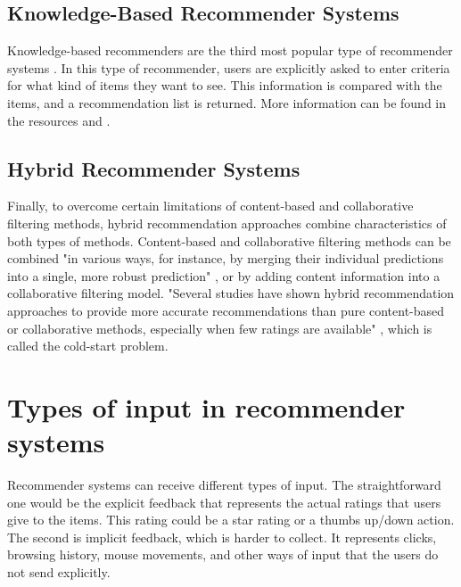 
\subsection{Knowledge-Based Recommender Systems}\label{chapter:knowledge_based}

Knowledge-based recommenders are the third most popular type of recommender systems \cite{burke2000knowledge}. In this type of recommender, users are explicitly asked to enter criteria for what kind of items they want to see. This information is compared with the items, and a recommendation list is returned. More information can be found in the resources \cite{burke2000knowledge} and \cite{felfernig2015constraint}.

\subsection{Hybrid Recommender Systems}

Finally, to overcome certain limitations of content-based and collaborative filtering methods, hybrid recommendation approaches combine characteristics of both types of methods. Content-based and collaborative filtering methods can be combined "in various ways, for instance, by merging their individual predictions into a single, more robust prediction" \cite{desrosiers2011comprehensive}, or by adding content information into a collaborative filtering model. "Several studies have shown hybrid recommendation approaches to provide more accurate recommendations than pure content-based or collaborative methods, especially when few ratings are available" \cite{desrosiers2011comprehensive},  which is called the cold-start problem.


\section{Types of input in recommender systems}

Recommender systems can receive different types of input. The straightforward one would be the explicit feedback that represents the actual ratings that users give to the items. This rating could be a star rating or a thumbs up/down action. The second is implicit feedback, which is harder to collect. It represents clicks, browsing history, mouse movements, and other ways of input that the users do not send explicitly.
